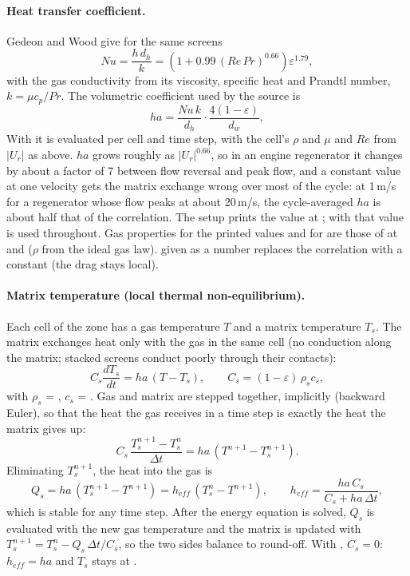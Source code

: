 \paragraph{Heat transfer coefficient.}
Gedeon and Wood give for the same screens
\begin{equation}
Nu = \frac{h\, d_h}{k} = \left(1 + 0.99\,(Re\,Pr)^{0.66}\right) \varepsilon^{1.79} ,
\end{equation}
with the gas conductivity from its viscosity, specific heat and Prandtl number, $k = \mu c_p/Pr$. The volumetric coefficient used by the source is
\begin{equation}
h a = \frac{Nu\, k}{d_h}\cdot\frac{4(1-\varepsilon)}{d_w} ,
\end{equation}
With  it is evaluated per cell and time step, with the cell's $\rho$ and $\mu$ and $Re$ from $|U_r|$ as above. $ha$ grows roughly as $|U_r|^{0.66}$, so in an engine regenerator it changes by about a factor of 7 between flow reversal and peak flow, and a constant value at one velocity gets the matrix exchange wrong over most of the cycle: at 1\,m/s for a regenerator whose flow peaks at about 20\,m/s, the cycle-averaged $ha$ is about half that of the correlation. The setup prints the value at ; with  that value is used throughout. Gas properties for the printed values and for  are those of  at  and  ($\rho$ from the ideal gas law).  given as a number replaces the correlation with a constant (the drag stays local).

\paragraph{Matrix temperature (local thermal non-equilibrium).}
Each cell of the zone has a gas temperature $T$ and a matrix temperature $T_s$. The matrix exchanges heat only with the gas in the same cell (no conduction along the matrix; stacked screens conduct poorly through their contacts):
\begin{equation}
C_s \frac{dT_s}{dt} = h a\,(T - T_s), \qquad C_s = (1-\varepsilon)\,\rho_s c_s ,
\end{equation}
with $\rho_s$ = , $c_s$ = . Gas and matrix are stepped together, implicitly (backward Euler), so that the heat the gas receives in a time step is exactly the heat the matrix gives up:
\begin{equation}
C_s\,\frac{T_s^{n+1} - T_s^{n}}{\Delta t} = h a\,(T^{n+1} - T_s^{n+1}) .
\end{equation}
Eliminating $T_s^{n+1}$, the heat into the gas is
\begin{equation}
Q_s = h a\,(T_s^{n+1} - T^{n+1}) = h_{eff}\,(T_s^{n} - T^{n+1}), \qquad h_{eff} = \frac{h a\, C_s}{C_s + h a\,\Delta t} ,
\end{equation}
which is stable for any time step. After the energy equation is solved, $Q_s$ is evaluated with the new gas temperature and the matrix is updated with $T_s^{n+1} = T_s^{n} - Q_s\,\Delta t/C_s$, so the two sides balance to round-off. With , $C_s = 0$: $h_{eff} = h a$ and $T_s$ stays at .

